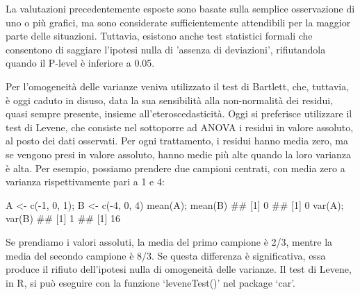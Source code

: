 \documentclass[a4paper,12pt,oneside]{book}
\newenvironment{Shaded}{\begin{snugshade}}{\end{snugshade}}
\newcommand{\DecValTok}[1]{#1}
\newcommand{\SpecialCharTok}[1]{#1}
\newcommand{\DocumentationTok}[1]{#1}
\newcommand{\OtherTok}[1]{#1}
\newcommand{\FunctionTok}[1]{#1}
\newcommand{\NormalTok}[1]{#1}
\begin{document}
La valutazioni precedentemente esposte sono basate sulla semplice osservazione di uno o più grafici, ma sono considerate sufficientemente attendibili per la maggior parte delle situazioni. Tuttavia, esistono anche test statistici formali che consentono di saggiare l'ipotesi nulla di 'assenza di deviazioni', rifiutandola quando il P-level è inferiore a 0.05.

Per l'omogeneità delle varianze veniva utilizzato il test di Bartlett, che, tuttavia, è oggi caduto in disuso, data la sua sensibilità alla non-normalità dei residui, quasi sempre presente, insieme all'eteroscedasticità. Oggi si preferisce utilizzare il test di Levene, che consiste nel sottoporre ad ANOVA i residui in valore assoluto, al posto dei dati osservati. Per ogni trattamento, i residui hanno media zero, ma se vengono presi in valore assoluto, hanno medie più alte quando la loro varianza è alta. Per esempio, possiamo prendere due campioni centrati, con media zero a varianza rispettivamente pari a 1 e 4:

\begin{Shaded}
\begin{Highlighting}[]
\NormalTok{A }\OtherTok{\textless{}{-}} \FunctionTok{c}\NormalTok{(}\SpecialCharTok{{-}}\DecValTok{1}\NormalTok{, }\DecValTok{0}\NormalTok{, }\DecValTok{1}\NormalTok{); B }\OtherTok{\textless{}{-}} \FunctionTok{c}\NormalTok{(}\SpecialCharTok{{-}}\DecValTok{4}\NormalTok{, }\DecValTok{0}\NormalTok{, }\DecValTok{4}\NormalTok{)}
\FunctionTok{mean}\NormalTok{(A); }\FunctionTok{mean}\NormalTok{(B)}
\DocumentationTok{\#\# [1] 0}
\DocumentationTok{\#\# [1] 0}
\FunctionTok{var}\NormalTok{(A); }\FunctionTok{var}\NormalTok{(B)}
\DocumentationTok{\#\# [1] 1}
\DocumentationTok{\#\# [1] 16}
\end{Highlighting}
\end{Shaded}

Se prendiamo i valori assoluti, la media del primo campione è 2/3, mentre la media del secondo campione è 8/3. Se questa differenza è significativa, essa produce il rifiuto dell'ipotesi nulla di omogeneità delle varianze. Il test di Levene, in R, si può eseguire con la funzione `leveneTest()' nel package `car'.
\end{document}
